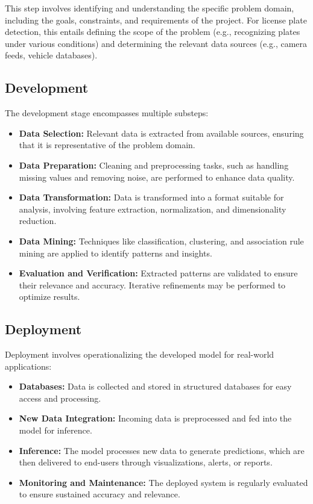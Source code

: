 This step involves identifying and understanding the specific problem domain, including the goals, constraints, and requirements of the project. For license plate detection, this entails defining the scope of the problem (e.g., recognizing plates under various conditions) and determining the relevant data sources (e.g., camera feeds, vehicle databases).

\subsection{Development}

The development stage encompasses multiple substeps:
\begin{itemize}
\item \textbf{Data Selection:} Relevant data is extracted from available sources, ensuring that it is representative of the problem domain.
\item \textbf{Data Preparation:} Cleaning and preprocessing tasks, such as handling missing values and removing noise, are performed to enhance data quality.
\item \textbf{Data Transformation:} Data is transformed into a format suitable for analysis, involving feature extraction, normalization, and dimensionality reduction.
\item \textbf{Data Mining:} Techniques like classification, clustering, and association rule mining are applied to identify patterns and insights.
\item \textbf{Evaluation and Verification:} Extracted patterns are validated to ensure their relevance and accuracy. Iterative refinements may be performed to optimize results.
\end{itemize}

\subsection{Deployment}

Deployment involves operationalizing the developed model for real-world applications:
\begin{itemize}
\item \textbf{Databases:} Data is collected and stored in structured databases for easy access and processing.
\item \textbf{New Data Integration:} Incoming data is preprocessed and fed into the model for inference.
\item \textbf{Inference:} The model processes new data to generate predictions, which are then delivered to end-users through visualizations, alerts, or reports.
\item \textbf{Monitoring and Maintenance:} The deployed system is regularly evaluated to ensure sustained accuracy and relevance.
\end{itemize}

